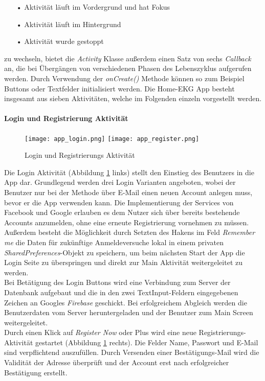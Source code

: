 \begin{itemize}
\item[•] Aktivität läuft im Vordergrund und hat Fokus
\item[•] Aktivität läuft im Hintergrund
\item[•] Aktivität wurde gestoppt
\end{itemize}

zu wechseln, bietet die \textit{Activity} Klasse außerdem einen Satz von sechs \textit{Callback} an, die bei Übergängen von verschiedenen Phasen des Lebenszyklus aufgerufen werden. Durch Verwendung der \textit{onCreate()} Methode können so zum Beispiel Buttons oder Textfelder initialisiert werden.
Die Home-EKG App besteht insgesamt aus sieben Aktivitäten, welche im Folgenden einzeln vorgestellt werden.

\paragraph{Login und Registrierung Aktivität}
\begin{figure} [!h]
	\begin{center}
		\texttt{[image: app\_login.png]}
		\hspace{1.5 cm}
		\texttt{[image: app\_register.png]}
	\end{center}
	\caption{Login und Registrierungs Aktivität}
	\label{app_login_reg}
\end{figure}

Die Login Aktivität (Abbildung \ref{app_login_reg} links) stellt den Einstieg des Benutzers in die App dar. Grundlegend werden drei Login Varianten angeboten, wobei der Benutzer nur bei der Methode über E-Mail einen neuen Account anlegen muss, bevor er die App verwenden kann. Die Implementierung der Services von Facebook und Google erlauben es dem Nutzer sich über bereits bestehende Accounts anzumelden, ohne eine erneute Registrierung vornehmen zu müssen. \\
Außerdem besteht die Möglichkeit durch Setzten des Hakens im Feld \textit{Remember me} die Daten für zukünftige Anmeldeversuche lokal in einem privaten \textit{SharedPreferences}-Objekt zu speichern, um beim nächsten Start der App die Login Seite zu überspringen und direkt zur Main Aktivität weitergeleitet zu werden. \\
Bei Betätigung des Login Buttons wird eine Verbindung zum Server der Datenbank aufgebaut und die in den zwei TextInput-Feldern eingegebenen Zeichen an Googles \textit{Firebase} geschickt. Bei erfolgreichem Abgleich werden die Benutzerdaten vom Server heruntergeladen und der Benutzer zum Main Screen weitergeleitet. \\
Durch einen Klick auf \textit{Register Now} oder Plus wird eine neue Registrierungs-Aktivität gestartet (Abbildung \ref{app_login_reg} rechts). Die Felder Name, Passwort und E-Mail sind verpflichtend auszufüllen. Durch Versenden einer Bestätigungs-Mail wird die Validität der Adresse überprüft und der Account erst nach erfolgreicher Bestätigung erstellt.

